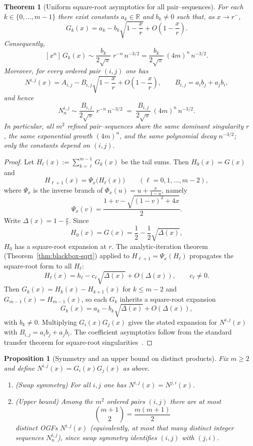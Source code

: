 \documentclass[11pt]{article}
\newtheorem{proposition}{Proposition}
\newtheorem{theorem}{Theorem}
\begin{document}
\begin{theorem}[Uniform square-root asymptotics for all pair--sequences]\label{thm:pair-uniform-asympt}
For each $k\in\{0,\dots,m-1\}$ there exist constants $a_k\in\mathbb{R}$ and $b_k\neq0$ such
that, as $x\to r^-$,
\[
G_k(x)=a_k-b_k\sqrt{1-\frac{x}{r}}+O\!\left(1-\frac{x}{r}\right).
\]
Consequently,
\[
[x^n]\,G_k(x)\sim \frac{b_k}{2\sqrt{\pi}}\; r^{-n}\,n^{-3/2}
=\frac{b_k}{2\sqrt{\pi}}\,(4m)^n\,n^{-3/2}.
\]
Moreover, for every ordered pair $(i,j)$ one has
\[
N^{i,j}(x)=A_{i,j}-B_{i,j}\sqrt{1-\frac{x}{r}}+O\!\left(1-\frac{x}{r}\right),
\qquad
B_{i,j}=a_i b_j+a_j b_i,
\]
and hence
\[
N^{i,j}_n \sim \frac{B_{i,j}}{2\sqrt{\pi}}\; r^{-n}\,n^{-3/2}
      \;=\; \frac{B_{i,j}}{2\sqrt{\pi}}\,(4m)^n\,n^{-3/2}.
\]
In particular, all $m^2$ refined pair--sequences share the same dominant singularity $r$,
the same exponential growth $(4m)^n$, and the same polynomial decay $n^{-3/2}$; only the
constants depend on $(i,j)$.
\end{theorem}

\begin{proof}
Let $H_\ell(x):=\sum_{k=\ell}^{m-1}G_k(x)$ be the tail sums. Then $H_0(x)=G(x)$ and
\[
H_{\ell+1}(x)=\Psi_x\bigl(H_\ell(x)\bigr)\qquad(\ell=0,1,\dots,m-2),
\]
where $\Psi_x$ is the inverse branch of $\Phi_x(u)=u+\frac{x}{1-u}$, namely
\[
\Psi_x(v)=\frac{1+v-\sqrt{(1-v)^2+4x}}{2}.
\]
Write $\Delta(x)=1-\frac{x}{r}$. Since
\[
H_0(x)=G(x)=\frac12-\frac12\sqrt{\Delta(x)},
\]
$H_0$ has a square-root expansion at $r$. The analytic-iteration theorem
(Theorem~\ref{thm:blackbox-sqrt}) applied to $H_{\ell+1}=\Psi_x(H_\ell)$ propagates the
square-root form to all $H_\ell$:
\[
H_\ell(x)=h_\ell-c_\ell\sqrt{\Delta(x)}+O(\Delta(x)),
\qquad c_\ell\neq0.
\]
Then $G_k(x)=H_k(x)-H_{k+1}(x)$ for $k\le m-2$ and $G_{m-1}(x)=H_{m-1}(x)$, so each $G_k$
inherits a square-root expansion
\[
G_k(x)=a_k-b_k\sqrt{\Delta(x)}+O(\Delta(x)),
\]
with $b_k\neq0$. Multiplying $G_i(x)G_j(x)$ gives the stated expansion for $N^{i,j}(x)$ with
$B_{i,j}=a_i b_j+a_j b_i$. The coefficient asymptotics follow from the standard transfer
theorem for square-root singularities~\cite[Theorem~VI.1]{FlajoletSedgewick2009}.
\end{proof}


\begin{proposition}[Symmetry and an upper bound on distinct products]\label{prop:pair-seq-symmetry}
Fix $m\ge2$ and define $N^{i,j}(x)=G_i(x)G_j(x)$ as above.
\begin{enumerate}
\item[(i)] (Swap symmetry) For all $i,j$ one has $N^{i,j}(x)=N^{j,i}(x)$.
\item[(ii)] (Upper bound) Among the $m^2$ ordered pairs $(i,j)$ there are at most
\[
\binom{m+1}{2}=\frac{m(m+1)}{2}
\]
distinct OGFs $N^{i,j}(x)$ (equivalently, at most that many distinct integer sequences $N^{i,j}_n$),
since swap symmetry identifies $(i,j)$ with $(j,i)$.
\end{enumerate}
\end{proposition}
\end{document}
